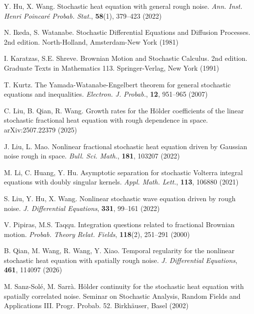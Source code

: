 \documentclass[11pt,reqno]{amsart}
\numberwithin{equation}{section}
\newcommand{\1}{{\bf 1}}
\newcommand{\2}{{\bf 2}}
\begin{document}
\begin{thebibliography}{}
Y. Hu, X. Wang. Stochastic heat equation with general rough noise. {\it Ann. Inst. Henri Poincaré Probab. Stat.}, \textbf{58}(1), 379--423 (2022)

N. Ikeda, S. Watanabe. Stochastic Differential Equations and Diffusion Processes. 2nd edition. North-Holland, Amsterdam-New York (1981)

I. Karatzas, S.E. Shreve. Brownian Motion and Stochastic Calculus. 2nd edition. Graduate Texts in Mathematics 113. Springer-Verlag, New York (1991)

T. Kurtz. The Yamada-Watanabe-Engelbert theorem for general stochastic equations and inequalities. {\it Electron. J. Probab.}, \textbf{12}, 951--965 (2007)

 

C. Liu, B. Qian, R. Wang. Growth rates for the H\"older coefficients of the linear stochastic fractional heat equation with rough dependence in space. arXiv:2507.22379 (2025)

J. Liu, L. Mao. Nonlinear fractional stochastic heat equation driven by Gaussian noise rough in space. {\it Bull. Sci. Math.}, \textbf{181}, 103207 (2022)

M. Li, C. Huang, Y. Hu. Asymptotic separation for stochastic Volterra integral equations with doubly singular kernels. {\it Appl. Math. Lett.}, \textbf{113}, 106880 (2021)

S. Liu, Y. Hu, X. Wang. Nonlinear stochastic wave equation driven by rough noise. {\it J. Differential Equations}, \textbf{331}, 99--161 (2022)


V. Pipiras, M.S. Taqqu. Integration questions related to fractional Brownian motion. {\it Probab. Theory Relat. Fields}, \textbf{118}(2), 251--291 (2000)

B. Qian, M. Wang, R. Wang, Y. Xiao.   Temporal regularity for the nonlinear stochastic heat equation with spatially rough noise. {\it J.  Differential Equations}, {\bf 461}, 114097  (2026)


M. Sanz-Sol\'e, M. Sarr\`a. H\"older continuity for the stochastic heat equation with spatially correlated noise.   Seminar on Stochastic Analysis, Random Fields and Applications III. Progr. Probab. 52. Birkh\"auser, Basel (2002)


\end{thebibliography}
\end{document}
